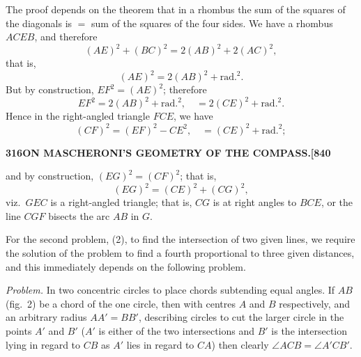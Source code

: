 \documentclass[12pt,a4paper]{article}
\theoremstyle{definition}
\begin{document}
The proof depends on the theorem that in a rhombus the sum of the squares of the diagonals is $=$ sum of the squares of the four sides. We have a rhombus $ACEB$, and therefore
\[
(AE)^2 + (BC)^2 = 2(AB)^2 + 2(AC)^2,
\]
that is,
\[
(AE)^2 = 2(AB)^2 + \text{rad.}^2.
\]
But by construction, $EF^2 = (AE)^2$; therefore
\[
EF^2 = 2(AB)^2 + \text{rad.}^2, \quad = 2(CE)^2 + \text{rad.}^2.
\]
Hence in the right-angled triangle $FCE$, we have
\[
(CF)^2 = (EF)^2 - CE^2, \quad = (CE)^2 + \text{rad.}^2;
\]

\newpage
\setcounter{page}{316}

\noindent\textbf{316}\hfill\textbf{ON MASCHERONI'S GEOMETRY OF THE COMPASS.}\hfill\textbf{[840}

\bigskip

\noindent and by construction, $(EG)^2 = (CF)^2$; that is,
\[
(EG)^2 = (CE)^2 + (CG)^2,
\]
viz.\ $GEC$ is a right-angled triangle; that is, $CG$ is at right angles to $BCE$, or the line $CGF$ bisects the arc $AB$ in $G$.

For the second problem, (2), to find the intersection of two given lines, we require the solution of the problem to find a fourth proportional to three given distances, and this immediately depends on the following problem.

\textit{Problem.} In two concentric circles to place chords subtending equal angles. If $AB$ (fig.\ 2) be a chord of the one circle, then with centres $A$ and $B$ respectively, and an arbitrary radius $AA' = BB'$, describing circles to cut the larger circle in the points $A'$ and $B'$ ($A'$ is either of the two intersections and $B'$ is the intersection lying in regard to $CB$ as $A'$ lies in regard to $CA$) then clearly $\angle ACB = \angle A'CB'$.

\begin{figure}[H]
\centering
{}
\end{figure}
\end{document}
